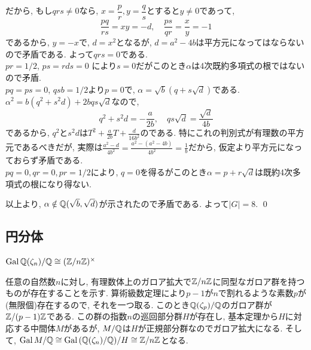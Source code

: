 \begin{egans}
だから, もし$qrs\neq 0$なら, $x=\dfrac{p}{r}, y=\dfrac{q}{s}$とすると$y\neq 0$であって,
\[\dfrac{pq}{rs} = xy = -d,\quad \dfrac{ps}{qr} = \dfrac{x}{y} = -1\]
であるから, $y=-x$で, $d=x^2$となるが, $d=a^2-4b$は平方元になってはならないので矛盾である. よって$qrs = 0$である. \\
 $pr = 1/2$, $ps = rds = 0$ により$s=0$だがこのとき$\alpha$は4次既約多項式の根ではないので矛盾. \\
 $pq=ps=0$, $qsb = 1/2$より$p=0$で, $\alpha = \sqrt{b}(q+s\sqrt{d})$である. $\alpha^2 = b(q^2 + s^2d) + 2bqs\sqrt{d}$なので,
\[q^2 + s^2d = -\frac{a}{2b},\quad qs\sqrt{d} = \frac{\sqrt{d}}{4b}\]
であるから, $q^2$と$s^2d$は$T^2 + \frac{a}{2b}T + \frac{d}{16b^2}$のである. 特にこれの判別式が有理数の平方元であるべきだが, 実際は$\frac{a^2 -d}{4b^2} = \frac{a^2-(a^2-4b)}{4b^2} = \frac{1}{b}$だから, 仮定より平方元になっておらず矛盾である. \\
 $pq=0, qr=0, pr=1/2$により, $q=0$を得るがこのとき$\alpha=p+r\sqrt{d}$は既約4次多項式の根になり得ない. \par
以上より, $\alpha\notin \mathbb{Q}(\sqrt{b},\sqrt{d})$が示されたので矛盾である. よって$|G|=8$. \qed
\end{egans}



\subsection{円分体}
\begin{prop}
\ben
\item $\operatorname{Gal}{\mathbb{Q}(\zeta_n)/\mathbb{Q}}\cong (\mathbb{Z}/n\mathbb{Z})^{\times}$
\een
\end{prop}

\begin{eg} 任意の自然数$n$に対し, 有理数体上のガロア拡大で$\mathbb{Z}/n\mathbb{Z}$に同型なガロア群を持つものが存在することを示す. 算術級数定理により$p-1$が$n$で割れるような素数$p$が(無限個)存在するので, それを一つ取る. このとき$\mathbb{Q}(\zeta_{p})/\mathbb{Q}$のガロア群が$\mathbb{Z}/(p-1)\mathbb{Z}$である. この群の指数$n$の巡回部分群$H$が存在し, 基本定理から$H$に対応する中間体$M$があるが, $M/\mathbb{Q}$は$H$が正規部分群なのでガロア拡大になる. そして, $\operatorname{Gal}{M/\mathbb{Q}} \cong \operatorname{Gal}{(\mathbb{Q}(\zeta_n)/\mathbb{Q})}/H \cong \mathbb{Z}/n\mathbb{Z}$となる.
\end{eg}




